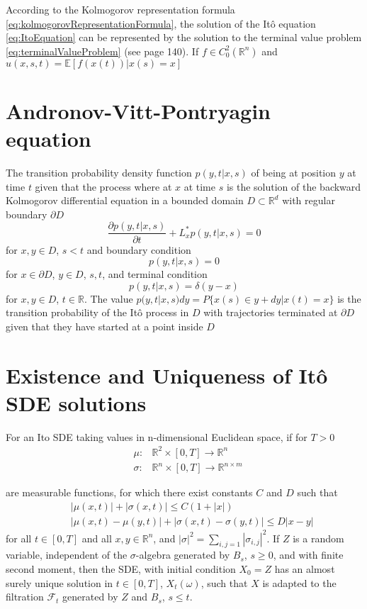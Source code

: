 \documentclass[12pt]{book}
\begin{document}
According to the Kolmogorov representation formula \ref{eq:kolmogorovRepresentationFormula}, the solution of the It\^{o} equation \ref{eq:ItoEquation} can be represented by the solution to the terminal value problem \ref{eq:terminalValueProblem} (see \cite{Oksendal14} page 140). 
If $f\in C^2_0(\mathbb{R}^n)$ and $	u(x,s,t)=\mathbb{E}[f(x(t))|x(s)=x]$

\section{Andronov-Vitt-Pontryagin equation}\label{section:AndronovVittPontryaginEquation}
The transition probability density function $p(y,t|x,s)$ of being at position $y$ at time $t$ given that the process where at $x$ at time $s$ is the solution of the backward Kolmogorov differential equation in a bounded domain $D\subset\mathbb{R}^d$ with regular boundary $\partial D$ 
\begin{equation*}
\frac{\partial p(y,t|x,s)}{\partial t}+L^*_xp(y,t|x,s) = 0
\end{equation*}
for $x,y\in D$, $s<t$ and boundary condition
\begin{equation*}
p(y,t|x,s)=0
\end{equation*}
for $x\in \partial D$, $y\in D$, $s,t$, and terminal condition
\begin{equation*}
p(y,t|x,s)=\delta(y-x)
\end{equation*}
for $x,y\in D$, $t\in \mathbb{R}$. The value $p(y,t|x,s)dy=P\{x(s)\in y+dy|x(t)=x\}$ is the transition probability of the It\^{o} process in $D$ with trajectories terminated at $\partial D$ given that they have started at a point inside $D$

\section{Existence and Uniqueness of It\^{o} SDE solutions}\label{section:existenceAndUniqueness}
For an Ito SDE taking values in n-dimensional Euclidean space, if for $T>0$\\
\begin{eqnarray*}
	&\mu:   &\mathbb{R}^2\times[0,T]\rightarrow \mathbb{R}^n\\
	&\sigma:&\mathbb{R}^n \times[0,T] \rightarrow \mathbb{R}^{n\times m}
\end{eqnarray*}

are measurable functions, for which there exist constants $C$ and $D$ such that 
\begin{eqnarray*}
	& &|\mu(x,t)|+|\sigma(x,t)|\leq C(1+|x|)\\
	& &|\mu(x,t)-\mu(y,t)|+|\sigma(x,t)-\sigma(y,t)|\leq D|x-y|
\end{eqnarray*}
for all $t\in [0,T]$ and all $x,y\in \mathbb{R}^n$, and $|\sigma|^2=\sum_{i,j=1}|\sigma_{i,j}|^2$. 
If $Z$ is a random variable, independent of the $\sigma$-algebra generated by $B_s$, $s\geq 0$, and with finite second moment, then the SDE, with initial condition $X_0=Z$ has an almost surely unique solution in $t\in[0,T]$, $X_t(\omega)$, such that $X$ is adapted to the filtration $\mathcal{F}_t$ generated by $Z$ and $B_s$, $s\leq t$.
\end{document}
